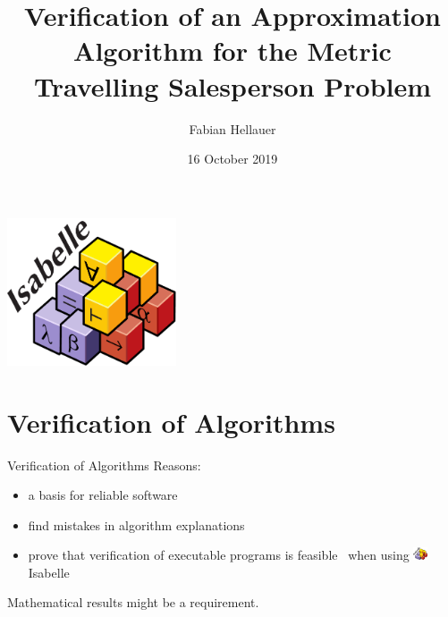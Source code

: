 \documentclass[%
	sans,
	12pt,
]{beamer}
\title{Verification of an Approximation Algorithm for the Metric Travelling Salesperson Problem}
\author{\normalsize Fabian Hellauer}
\institute[]{\footnotesize Technische Universität München}
\date{\footnotesize16 October 2019}
\begin{document}
\maketitle

\begin{frame}
\begin{center}
\includegraphics[width=5cm]{isabelle.pdf}
\end{center}
\end{frame}

\newcommand{\pivot}[1]{{\color{red}#1}}
\newcommand{\ltpiv}[1]{{\color{blue}#1}}
\newcommand{\gtpiv}[1]{{\color{olive}#1}}

\section{Verification of Algorithms}
\begin{frame}{Verification of Algorithms}%
Reasons:
\begin{itemize}
	\item a basis for reliable software\pause
	\item find mistakes in algorithm explanations\pause
	\item prove that verification of executable programs
	is feasible\ %
	\pause when using \includegraphics[height=1em]{isabelle.pdf}Isabelle\pause
\end{itemize}
Mathematical results might be a requirement.
\end{frame}
\end{document}
